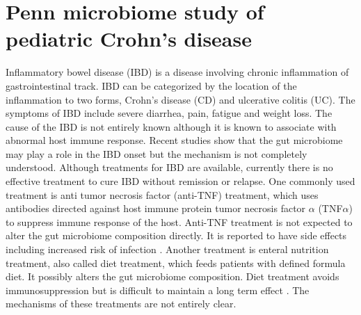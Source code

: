 \section{Penn microbiome study of pediatric Crohn's disease}
Inflammatory bowel disease (IBD) is a disease involving chronic inflammation of gastrointestinal track. IBD can be categorized by the location of the inflammation to two forms, Crohn's disease (CD) and ulcerative colitis (UC). The symptoms of IBD include severe diarrhea, pain, fatigue and weight loss. The cause of the IBD is not entirely known although it is known to associate with abnormal host immune response. Recent studies show that the gut microbiome may play a role in the IBD onset \citep{gevers2014treatment} but the mechanism is not completely understood. Although treatments for IBD are available, currently there is no effective treatment to cure IBD without remission or relapse. One commonly used treatment is anti tumor necrosis factor (anti-TNF) treatment, which uses antibodies directed against host immune protein tumor necrosis factor $\alpha$ (TNF$\alpha$) to suppress immune response of the host. Anti-TNF treatment is not expected to alter the gut microbiome composition directly. It is reported to have side effects including increased risk of infection \citep{Borrelli:2006tk, Rutgeerts:2012ul}. Another treatment is enteral nutrition treatment, also called diet treatment, which feeds patients with defined formula diet. It possibly alters the gut microbiome composition. Diet treatment avoids immunosuppression but is difficult to maintain a long term effect \citep{Grover:2013dj}. The mechanisms of these treatments are not entirely clear.

